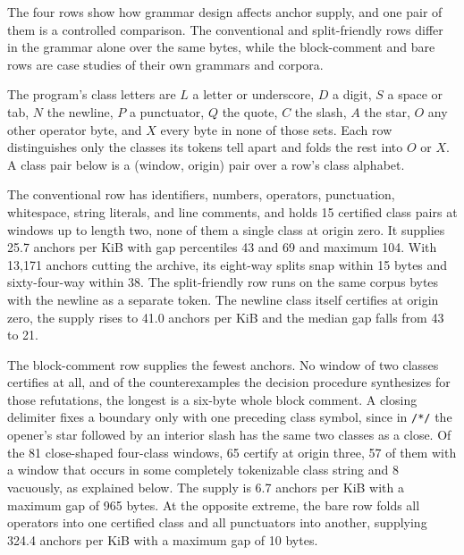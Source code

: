 \documentclass[11pt,a4paper]{article}
\theoremstyle{definition}
\theoremstyle{plain}
\newcommand{\code}[1]{\texttt{#1}}
\begin{document}
The four rows show how grammar design affects anchor supply, and one pair of them is a controlled comparison. The
conventional and split-friendly rows differ in the grammar alone over the same bytes, while the block-comment and bare
rows are case studies of their own grammars and corpora.

The program's class letters are $L$ a letter or underscore, $D$ a digit, $S$ a space or tab, $N$ the newline, $P$ a
punctuator, $Q$ the quote, $C$ the slash, $A$ the star, $O$ any other operator byte, and $X$ every byte in none of those
sets. Each row distinguishes only the classes its tokens tell apart and folds the rest into $O$ or $X$. A class pair
below is a (window, origin) pair over a row's class alphabet.

The conventional row has identifiers, numbers, operators, punctuation, whitespace, string literals, and line comments,
and holds 15 certified class pairs at windows up to length two, none of them a single class at origin zero. It supplies
25.7 anchors per KiB with gap percentiles 43 and 69 and maximum 104. With 13{,}171 anchors cutting the archive, its
eight-way splits snap within 15 bytes and sixty-four-way within 38. The split-friendly row runs on the same corpus bytes
with the newline as a separate token. The newline class itself certifies at origin zero, the supply rises to 41.0
anchors per KiB and the median gap falls from 43 to 21.

The block-comment row supplies the fewest anchors. No window of two classes certifies at all, and of the counterexamples
the decision procedure synthesizes for those refutations, the longest is a six-byte whole block comment. A closing
delimiter fixes a boundary only with one preceding class symbol, since in \code{/*/} the opener's star followed by an
interior slash has the same two classes as a close. Of the 81 close-shaped four-class windows, 65 certify at origin
three, 57 of them with a window that occurs in some completely tokenizable class string and 8 vacuously, as explained
below. The supply is 6.7 anchors per KiB with a maximum gap of 965 bytes. At the opposite extreme, the bare row folds
all operators into one certified class and all punctuators into another, supplying 324.4 anchors per KiB with a maximum
gap of 10 bytes.
\end{document}
